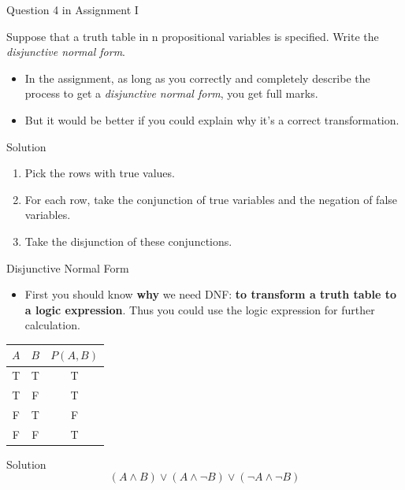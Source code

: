 \begin{frame}{Question 4 in Assignment I}
    \begin{example}
        Suppose that a truth table in n propositional variables is specified. Write the \emph{disjunctive normal form}.
    \end{example}
    \begin{itemize}
        \item In the assignment, as long as you correctly and completely describe the process to get a \emph{disjunctive normal form}, you get full marks.
        \item But it would be better if you could explain why it's a correct transformation.
    \end{itemize}
    \begin{block}{Solution}
        \begin{enumerate}
            \item Pick the rows with true values.
            \item For each row, take the conjunction of true variables and the negation of false variables.
            \item Take the disjunction of these conjunctions.
        \end{enumerate}
    \end{block}
\end{frame}

\begin{frame}{Disjunctive Normal Form}
    \begin{itemize}
        \item First you should know \textbf{why} we need DNF: \textbf{to transform a truth table to a logic expression}. Thus you could use the logic expression for further calculation.
    \end{itemize}
    \begin{example}
        \begin{table}[H]
            \centering
            \begin{tabular}{|c|c|c|}
                $A$ & $B$ & $P(A,B)$\\\hline\hline
                T & T & T \\
                T & F & T \\
                F & T & F \\
                F & F & T
            \end{tabular}
        \end{table}
    \end{example}
    \begin{block}{Solution}
        $$(A\wedge B)\vee(A\wedge\neg B)\vee(\neg A\wedge\neg B)$$
    \end{block}
\end{frame}

